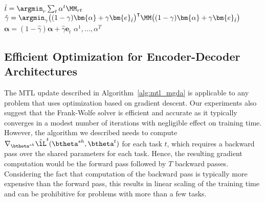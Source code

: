 \begin{minipage}{\textwidth}
\begin{algorithm}[H]
\begin{algorithmic}[1]
\Repeat
\State $\hat{t} = \argmin_r \sum_t \alpha^t \MM_{rt}$
\State $\hat{\gamma} = \argmin_{\gamma}  \big( (1 - \gamma) \bm{\alpha} + \gamma \bm{e}_{\hat{t}}  \big)^\intercal \MM  \big( (1 - \gamma) \bm{\alpha} + \gamma \bm{e}_{\hat{t}}  \big)$ 
\State $\bm{\alpha} = (1- \hat{\gamma})\bm{\alpha} + \hat{\gamma} \bm{e}_{\hat{t}}$
 $\alpha^1,\ldots,\alpha^{T}$
\EndProcedure
\end{algorithmic}
\end{algorithm}
\end{minipage}


\subsection{Efficient Optimization for Encoder-Decoder Architectures}
\label{sec:approximation}

The MTL update described in Algorithm~\ref{alg:mtl_mgda} is applicable to any problem that uses optimization based on gradient descent. Our experiments also suggest that the Frank-Wolfe solver is efficient and accurate as it typically converges in a modest number of iterations with negligible effect on training time. However, the algorithm we described needs to compute $\nabla_{\btheta^{sh}} \hat{\lL}^t(\btheta^{sh},\btheta^t)$ for each task $t$, which requires a backward pass over the shared parameters for each task. Hence, the resulting gradient computation would be the forward pass followed by $T$ backward passes. Considering the fact that computation of the backward pass is typically more expensive than the forward pass, this results in linear scaling of the training time and can be prohibitive for problems with more than a few tasks.

